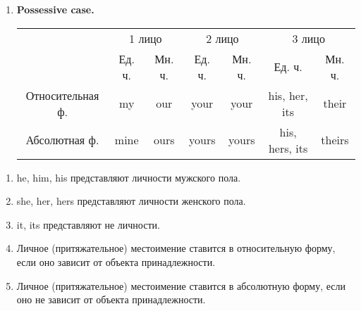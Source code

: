 \documentclass[oneside]{book}
\begin{document}
\begin{enumerate}
        \item \textbf{Possessive case.}
        \begin{center}
            \begin{tabular}{|c|cc|cc|cc|}
                \hline
                \multirow{2}{*}{}& \multicolumn{2}{c|}{1 лицо}         & \multicolumn{2}{c|}{2 лицо}          & \multicolumn{2}{c|}{3 лицо}                  \\ \cline{2-7} 
                                 & \multicolumn{1}{c|}{Ед. ч.}& Мн. ч. & \multicolumn{1}{c|}{Ед. ч.} & Мн. ч. & \multicolumn{1}{c|}{Ед. ч.}         & Мн. ч. \\ \hline
                Относительная ф. & \multicolumn{1}{c|}{my}    & our    & \multicolumn{1}{c|}{your}   & your   & \multicolumn{1}{c|}{his, her, its}  & their  \\ \hline
                Абсолютная ф.    & \multicolumn{1}{c|}{mine}  & ours   & \multicolumn{1}{c|}{yours}  & yours  & \multicolumn{1}{c|}{his, hers, its} & theirs \\ \hline
            \end{tabular}
        \end{center}
    \end{enumerate}

    \begin{enumerate}
        \item he, him, his представляют личности мужского пола.

        \item she, her, hers представляют личности женского пола.

        \item it, its представляют не личности.

        \item Личное (притяжательное) местоимение
        ставится в относительную форму,
        если оно зависит от объекта
        принадлежности.

        \item Личное (притяжательное) местоимение
        ставится в абсолютную форму,
        если оно не зависит от объекта
        принадлежности.
    \end{enumerate}
\end{document}
